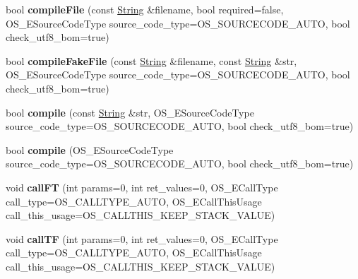 \begin{DoxyCompactItemize}
\item 
bool {\bfseries compile\+File} (const \hyperlink{class_object_script_1_1_o_s_1_1_string}{String} \&filename, bool required=false, O\+S\+\_\+\+E\+Source\+Code\+Type source\+\_\+code\+\_\+type=O\+S\+\_\+\+S\+O\+U\+R\+C\+E\+C\+O\+D\+E\+\_\+\+A\+U\+TO, bool check\+\_\+utf8\+\_\+bom=true)\hypertarget{class_object_script_1_1_o_s_af0782feef5d32df3615ad7dae0e1e6dd}{}\label{class_object_script_1_1_o_s_af0782feef5d32df3615ad7dae0e1e6dd}

\item 
bool {\bfseries compile\+Fake\+File} (const \hyperlink{class_object_script_1_1_o_s_1_1_string}{String} \&filename, const \hyperlink{class_object_script_1_1_o_s_1_1_string}{String} \&str, O\+S\+\_\+\+E\+Source\+Code\+Type source\+\_\+code\+\_\+type=O\+S\+\_\+\+S\+O\+U\+R\+C\+E\+C\+O\+D\+E\+\_\+\+A\+U\+TO, bool check\+\_\+utf8\+\_\+bom=true)\hypertarget{class_object_script_1_1_o_s_a06d8a34424ea0361f9970b0ad0d9cecc}{}\label{class_object_script_1_1_o_s_a06d8a34424ea0361f9970b0ad0d9cecc}

\item 
bool {\bfseries compile} (const \hyperlink{class_object_script_1_1_o_s_1_1_string}{String} \&str, O\+S\+\_\+\+E\+Source\+Code\+Type source\+\_\+code\+\_\+type=O\+S\+\_\+\+S\+O\+U\+R\+C\+E\+C\+O\+D\+E\+\_\+\+A\+U\+TO, bool check\+\_\+utf8\+\_\+bom=true)\hypertarget{class_object_script_1_1_o_s_ad33fe32f629e54b67930fd47e9dcc246}{}\label{class_object_script_1_1_o_s_ad33fe32f629e54b67930fd47e9dcc246}

\item 
bool {\bfseries compile} (O\+S\+\_\+\+E\+Source\+Code\+Type source\+\_\+code\+\_\+type=O\+S\+\_\+\+S\+O\+U\+R\+C\+E\+C\+O\+D\+E\+\_\+\+A\+U\+TO, bool check\+\_\+utf8\+\_\+bom=true)\hypertarget{class_object_script_1_1_o_s_ac3444a00dd8cc593bdf6036cabbf67cf}{}\label{class_object_script_1_1_o_s_ac3444a00dd8cc593bdf6036cabbf67cf}

\item 
void {\bfseries call\+FT} (int params=0, int ret\+\_\+values=0, O\+S\+\_\+\+E\+Call\+Type call\+\_\+type=O\+S\+\_\+\+C\+A\+L\+L\+T\+Y\+P\+E\+\_\+\+A\+U\+TO, O\+S\+\_\+\+E\+Call\+This\+Usage call\+\_\+this\+\_\+usage=O\+S\+\_\+\+C\+A\+L\+L\+T\+H\+I\+S\+\_\+\+K\+E\+E\+P\+\_\+\+S\+T\+A\+C\+K\+\_\+\+V\+A\+L\+UE)\hypertarget{class_object_script_1_1_o_s_a662a1d9545e237294eb94be8e4586849}{}\label{class_object_script_1_1_o_s_a662a1d9545e237294eb94be8e4586849}

\item 
void {\bfseries call\+TF} (int params=0, int ret\+\_\+values=0, O\+S\+\_\+\+E\+Call\+Type call\+\_\+type=O\+S\+\_\+\+C\+A\+L\+L\+T\+Y\+P\+E\+\_\+\+A\+U\+TO, O\+S\+\_\+\+E\+Call\+This\+Usage call\+\_\+this\+\_\+usage=O\+S\+\_\+\+C\+A\+L\+L\+T\+H\+I\+S\+\_\+\+K\+E\+E\+P\+\_\+\+S\+T\+A\+C\+K\+\_\+\+V\+A\+L\+UE)\hypertarget{class_object_script_1_1_o_s_a37e3547b79d14dcbb7a6b61095da8aaf}{}\label{class_object_script_1_1_o_s_a37e3547b79d14dcbb7a6b61095da8aaf}


\end{DoxyCompactItemize}
